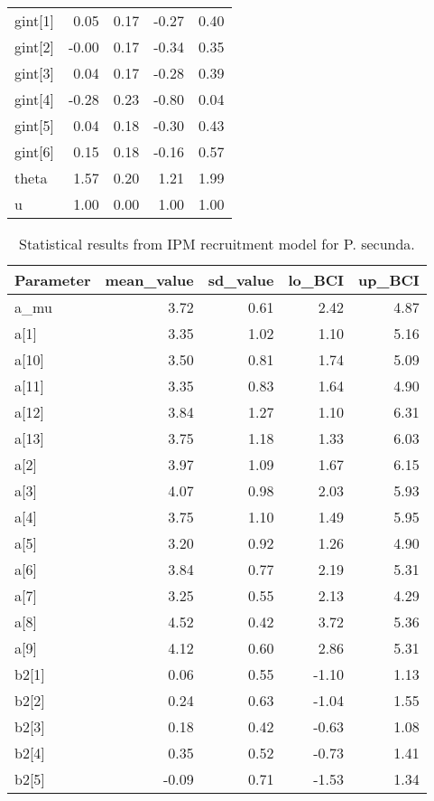 \documentclass[12pt,]{article}
\begin{document}
\begin{table}[ht]
{\begin{tabular}{lrrrr}
  gint[1] & 0.05 & 0.17 & -0.27 & 0.40 \\ 
  gint[2] & -0.00 & 0.17 & -0.34 & 0.35 \\ 
  gint[3] & 0.04 & 0.17 & -0.28 & 0.39 \\ 
  gint[4] & -0.28 & 0.23 & -0.80 & 0.04 \\ 
  gint[5] & 0.04 & 0.18 & -0.30 & 0.43 \\ 
  gint[6] & 0.15 & 0.18 & -0.16 & 0.57 \\ 
  theta & 1.57 & 0.20 & 1.21 & 1.99 \\ 
  u & 1.00 & 0.00 & 1.00 & 1.00 \\ 
   \hline
\end{tabular}
}
\end{table}\begin{table}[ht]
\centering
\caption{Statistical results from IPM recruitment model for P. secunda.} 
{\footnotesize
\begin{tabular}{lrrrr}
  \hline
Parameter & mean\_value & sd\_value & lo\_BCI & up\_BCI \\ 
  \hline
a\_mu & 3.72 & 0.61 & 2.42 & 4.87 \\ 
  a[1] & 3.35 & 1.02 & 1.10 & 5.16 \\ 
  a[10] & 3.50 & 0.81 & 1.74 & 5.09 \\ 
  a[11] & 3.35 & 0.83 & 1.64 & 4.90 \\ 
  a[12] & 3.84 & 1.27 & 1.10 & 6.31 \\ 
  a[13] & 3.75 & 1.18 & 1.33 & 6.03 \\ 
  a[2] & 3.97 & 1.09 & 1.67 & 6.15 \\ 
  a[3] & 4.07 & 0.98 & 2.03 & 5.93 \\ 
  a[4] & 3.75 & 1.10 & 1.49 & 5.95 \\ 
  a[5] & 3.20 & 0.92 & 1.26 & 4.90 \\ 
  a[6] & 3.84 & 0.77 & 2.19 & 5.31 \\ 
  a[7] & 3.25 & 0.55 & 2.13 & 4.29 \\ 
  a[8] & 4.52 & 0.42 & 3.72 & 5.36 \\ 
  a[9] & 4.12 & 0.60 & 2.86 & 5.31 \\ 
  b2[1] & 0.06 & 0.55 & -1.10 & 1.13 \\ 
  b2[2] & 0.24 & 0.63 & -1.04 & 1.55 \\ 
  b2[3] & 0.18 & 0.42 & -0.63 & 1.08 \\ 
  b2[4] & 0.35 & 0.52 & -0.73 & 1.41 \\ 
  b2[5] & -0.09 & 0.71 & -1.53 & 1.34 \\ 

\end{tabular}}
\end{table}
\end{document}
